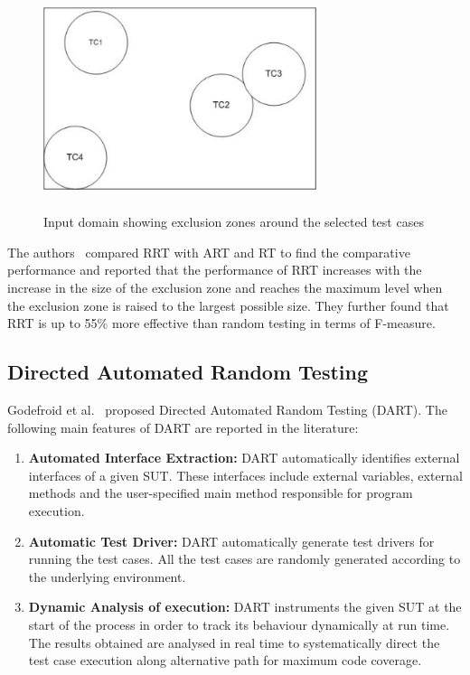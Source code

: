 \begin{figure}[h]
	\centering
	\includegraphics[width= 8cm, height = 6.5cm]{chapter2/RRT.pdf}
	\caption{Input domain showing exclusion zones around the selected test cases}
\end{figure}

The authors~\cite{chan2003normalized} compared RRT with ART and RT to find the comparative performance and reported that the performance of RRT increases with the increase in the size of the exclusion zone and reaches the maximum level when the exclusion zone is raised to the largest possible size. %
They further found that RRT is up to 55\% more effective than random testing in terms of F-measure.



\subsection{Directed Automated Random Testing}
Godefroid et al.~\cite{godefroid2005dart} proposed Directed Automated Random Testing (DART). %
The following main features of DART are reported in the literature:
\begin{enumerate}
\item {\bf Automated Interface Extraction:} DART automatically identifies external interfaces of a given SUT. These interfaces include external variables, external methods and the user-specified main method responsible for program execution.
\item {\bf Automatic Test Driver:} DART automatically generate test drivers for running the test cases. All the test cases are randomly generated according to the underlying environment.
\item {\bf Dynamic Analysis of execution:} DART instruments the given SUT at the start of the process in order to track its behaviour dynamically at run time. The results obtained are analysed in real time to systematically direct the test case execution along alternative path for maximum code coverage.
\end{enumerate}

